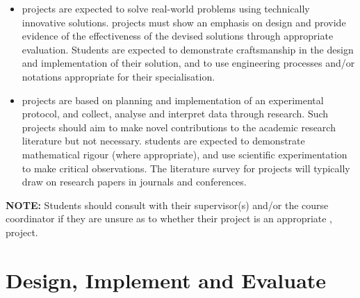 \begin{itemize}
\item \engr projects are expected to solve real-world problems using
  technically innovative solutions.  \engr projects must show an
  emphasis on design and provide evidence of the effectiveness of the devised
  solutions through appropriate evaluation. Students are expected to
  demonstrate craftsmanship in the design and implementation of their solution,
  and to use engineering processes and/or notations appropriate for their
  specialisation.

\item \bsc projects are based on planning and implementation of an experimental protocol, and collect, 
analyse and interpret data through
  research. Such projects should aim to make novel contributions to
  the academic research literature but not necessary.  \bsc students are expected to
  demonstrate mathematical rigour (where appropriate), and use
  scientific experimentation to make critical observations. The literature
  survey for \bsc projects will typically draw on research papers in journals
  and conferences.
\end{itemize}

{\bf NOTE:} Students should consult with their supervisor(s) and/or
the course coordinator if they are unsure as to whether their project
is an appropriate \engr, \bsc project.



\section{Design, Implement and Evaluate}

